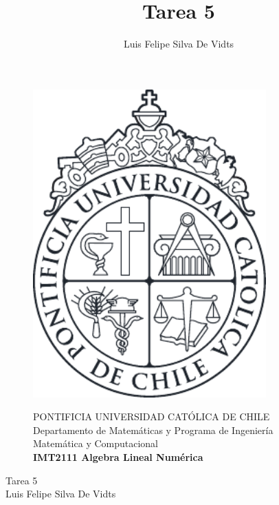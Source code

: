 \documentclass{article}
\title{Tarea 5\\}
\author{Luis Felipe Silva De Vidts}
\begin{document}
\begin{figure}
\begin{minipage}{2.5cm}
\includegraphics[width=0.8\textwidth]{./figures/LogoUC-BN}
\end{minipage}
\begin{minipage}{14.5cm}
\vspace{4mm}
{\sc PONTIFICIA UNIVERSIDAD CAT\'OLICA DE CHILE}\\
Departamento de Matemáticas y Programa de Ingeniería Matemática y Computacional \\
{\bf IMT2111 Algebra Lineal Numérica}\\
\vspace{0mm}
\hrulefill
\end{minipage}
\end{figure}
\phantom{""}
\vspace{-5mm}
\normalsize
\begin{center}
\Huge Tarea 5\\
\normalsize Luis Felipe Silva De Vidts
\end{center}
\end{document}
